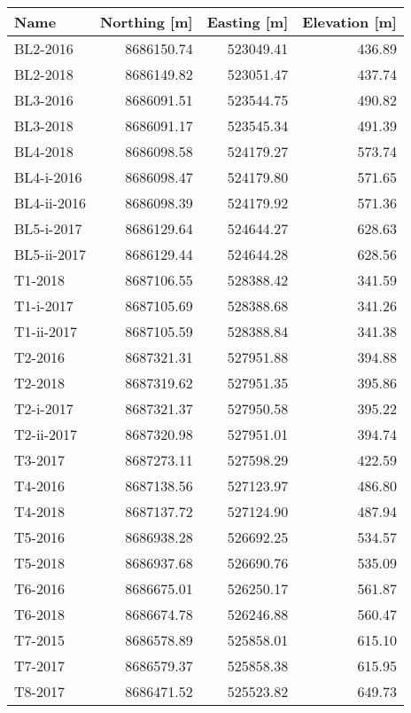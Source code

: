 \begin{tabular}{lrrr}
\toprule
        Name &  Northing [m] &  Easting [m] &  Elevation [m] \\
\midrule
    BL2-2016 &    8686150.74 &    523049.41 &         436.89 \\
    BL2-2018 &    8686149.82 &    523051.47 &         437.74 \\
    BL3-2016 &    8686091.51 &    523544.75 &         490.82 \\
    BL3-2018 &    8686091.17 &    523545.34 &         491.39 \\
    BL4-2018 &    8686098.58 &    524179.27 &         573.74 \\
  BL4-i-2016 &    8686098.47 &    524179.80 &         571.65 \\
 BL4-ii-2016 &    8686098.39 &    524179.92 &         571.36 \\
  BL5-i-2017 &    8686129.64 &    524644.27 &         628.63 \\
 BL5-ii-2017 &    8686129.44 &    524644.28 &         628.56 \\
     T1-2018 &    8687106.55 &    528388.42 &         341.59 \\
   T1-i-2017 &    8687105.69 &    528388.68 &         341.26 \\
  T1-ii-2017 &    8687105.59 &    528388.84 &         341.38 \\
     T2-2016 &    8687321.31 &    527951.88 &         394.88 \\
     T2-2018 &    8687319.62 &    527951.35 &         395.86 \\
   T2-i-2017 &    8687321.37 &    527950.58 &         395.22 \\
  T2-ii-2017 &    8687320.98 &    527951.01 &         394.74 \\
     T3-2017 &    8687273.11 &    527598.29 &         422.59 \\
     T4-2016 &    8687138.56 &    527123.97 &         486.80 \\
     T4-2018 &    8687137.72 &    527124.90 &         487.94 \\
     T5-2016 &    8686938.28 &    526692.25 &         534.57 \\
     T5-2018 &    8686937.68 &    526690.76 &         535.09 \\
     T6-2016 &    8686675.01 &    526250.17 &         561.87 \\
     T6-2018 &    8686674.78 &    526246.88 &         560.47 \\
     T7-2015 &    8686578.89 &    525858.01 &         615.10 \\
     T7-2017 &    8686579.37 &    525858.38 &         615.95 \\
     T8-2017 &    8686471.52 &    525523.82 &         649.73 \\
\bottomrule
\end{tabular}
